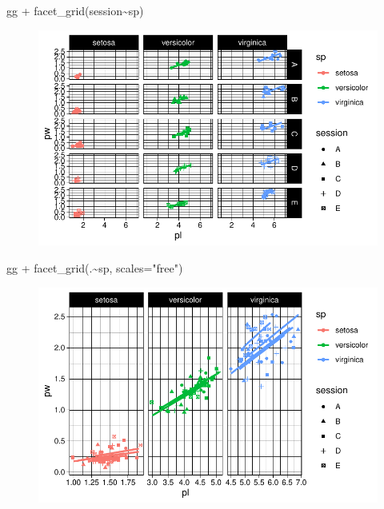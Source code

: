 \documentclass[
  letterpaper,
  DIV=11,
  numbers=noendperiod]{scrreprt}
\newenvironment{Shaded}{\begin{snugshade}}{\end{snugshade}}
\newcommand{\AttributeTok}[1]{\textcolor[rgb]{0.40,0.45,0.13}{#1}}
\newcommand{\FunctionTok}[1]{\textcolor[rgb]{0.28,0.35,0.67}{#1}}
\newcommand{\NormalTok}[1]{\textcolor[rgb]{0.00,0.23,0.31}{#1}}
\newcommand{\SpecialCharTok}[1]{\textcolor[rgb]{0.37,0.37,0.37}{#1}}
\newcommand{\StringTok}[1]{\textcolor[rgb]{0.13,0.47,0.30}{#1}}
\begin{document}
\begin{Shaded}
\begin{Highlighting}[]
\NormalTok{gg }\SpecialCharTok{+} \FunctionTok{facet\_grid}\NormalTok{(session}\SpecialCharTok{\textasciitilde{}}\NormalTok{sp)}
\end{Highlighting}
\end{Shaded}

\begin{figure}[H]

{\centering \includegraphics{ggplot2_files/figure-pdf/unnamed-chunk-27-1.pdf}

}

\end{figure}

\begin{Shaded}
\begin{Highlighting}[]
\NormalTok{gg }\SpecialCharTok{+} \FunctionTok{facet\_grid}\NormalTok{(.}\SpecialCharTok{\textasciitilde{}}\NormalTok{sp, }\AttributeTok{scales=}\StringTok{"free"}\NormalTok{)}
\end{Highlighting}
\end{Shaded}

\begin{figure}[H]

{\centering \includegraphics{ggplot2_files/figure-pdf/unnamed-chunk-27-2.pdf}

}

\end{figure}
\end{document}
